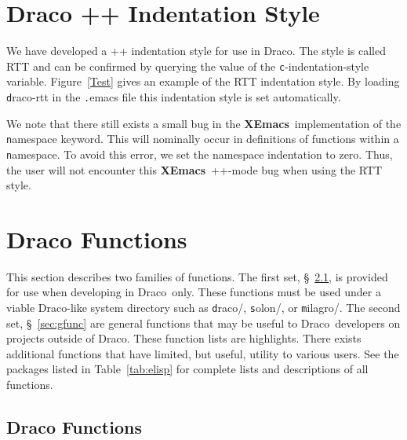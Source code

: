 \documentclass[11pt]{nmemo}
\newcommand{\comp}[1]{{\normalfont\texttt#1}}
\newcommand{\draco}{{\normalfont\sffamily Draco}}
\newcommand{\xemacs}{{\normalfont\bfseries XEmacs}}
\begin{document}

\section{Draco \C++ Indentation Style}

We have developed a \C++ indentation style for use in \draco.  The
style is called RTT and can be confirmed by querying the value of the
\comp{c-indentation-style} variable.  Figure~\ref{Test} gives an
example of the RTT indentation style.    By loading \comp{draco-rtt} in
the \comp{.emacs} file this indentation style is set automatically.

We note that there still exists a small bug in the \xemacs\ 
implementation of the \comp{namespace} keyword.  This will nominally
occur in definitions of functions within a \comp{namespace}.  To avoid
this error, we set the namespace indentation to zero.  Thus, the user
will not encounter this \xemacs\ \C++-mode bug when using the RTT
style.


\section{Draco Functions}
\label{sec:func}

This section describes two families of functions.  The first set,
\S~\ref{sec:dfunc}, is provided for use when developing in \draco\ 
only.  These functions must be used under a viable \draco-like system
directory such as \comp{draco/}, \comp{solon/}, or \comp{milagro/}.
The second set, \S~\ref{sec:gfunc} are general functions that may be
useful to \draco\ developers on projects outside of \draco.  These
function lists are highlights.  There exists additional functions that 
have limited, but useful, utility to various users.  See the packages
listed in Table~\ref{tab:elisp} for complete lists and descriptions of 
all functions.  

\subsection{Draco Functions}
\label{sec:dfunc}
\end{document}

